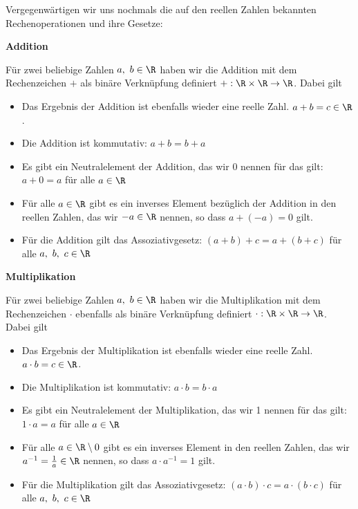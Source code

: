 Vergegenwärtigen wir uns nochmals die auf den reellen Zahlen bekannten Rechenoperationen und ihre Gesetze:

\textbf{Addition}

Für zwei beliebige Zahlen \(a,\ b\in\R\) haben wir die Addition mit dem Rechenzeichen \(+\) als binäre Verknüpfung definiert \(+:\R\times\R\rightarrow\R\). Dabei gilt

\begin{itemize}
	\item Das Ergebnis der Addition ist ebenfalls wieder eine reelle Zahl. \(a+b=c\in\R\).
	\item Die Addition ist kommutativ: \(a+b=b+a\)
	\item Es gibt ein Neutralelement der Addition, das wir 0 nennen für das gilt: \(a+0=a\) für alle \(a\in\R\)
	\item Für alle \(a\in\R\) gibt es ein inverses Element bezüglich der Addition in den reellen Zahlen, das wir \(-a\in\R\) nennen, so dass \(a+(-a)=0\) gilt.
	\item Für die Addition gilt das Assoziativgesetz: \((a+b)+c=a+(b+c)\) für alle \(a,\ b,\ c\in\R\)
\end{itemize}

\textbf{Multiplikation}

Für zwei beliebige Zahlen \(a,\ b\in\R\) haben wir die Multiplikation mit dem Rechenzeichen \(\cdot\) ebenfalls als binäre Verknüpfung definiert \(\cdot:\R\times\R\rightarrow\R\). Dabei gilt

\begin{itemize}
	\item Das Ergebnis der Multiplikation ist ebenfalls wieder eine reelle Zahl. \(a\cdot b=c\in\R\).
	\item Die Multiplikation ist kommutativ: \(a\cdot b=b\cdot a\)
	\item Es gibt ein Neutralelement der Multiplikation, das wir 1 nennen für das gilt: \(1\cdot a=a\) für alle \(a\in\R\)
	\item Für alle \(a\in\R\setminus{0}\) gibt es ein inverses Element in den reellen Zahlen, das wir \(a^{-1}=\frac{1}{a}\in\R\) nennen, so dass \(a\cdot a^{-1}=1\) gilt.
	\item Für die Multiplikation gilt das Assoziativgesetz: \((a\cdot b)\cdot c=a\cdot (b\cdot c)\) für alle \(a,\ b,\ c\in\R\)
\end{itemize}

